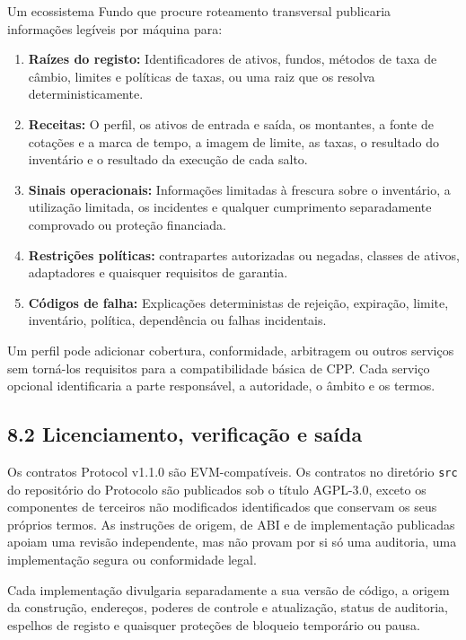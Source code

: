 \documentclass[11pt]{article}
\begin{document}
Um ecossistema Fundo que procure roteamento transversal publicaria informações legíveis por máquina para:

\begin{enumerate}[leftmargin=*]
\item \textbf{Raízes do registo:} Identificadores de ativos, fundos, métodos de taxa de câmbio, limites e políticas de taxas, ou uma raiz que os resolva deterministicamente.
\item \textbf{Receitas:} O perfil, os ativos de entrada e saída, os montantes, a fonte de cotações e a marca de tempo, a imagem de limite, as taxas, o resultado do inventário e o resultado da execução de cada salto.
\item \textbf{Sinais operacionais:} Informações limitadas à frescura sobre o inventário, a utilização limitada, os incidentes e qualquer cumprimento separadamente comprovado ou proteção financiada.
\item \textbf{Restrições políticas:} contrapartes autorizadas ou negadas, classes de ativos, adaptadores e quaisquer requisitos de garantia.
\item \textbf{Códigos de falha:} Explicações deterministas de rejeição, expiração, limite, inventário, política, dependência ou falhas incidentais.
\end{enumerate}
Um perfil pode adicionar cobertura, conformidade, arbitragem ou outros serviços sem torná-los requisitos para a compatibilidade básica de CPP. Cada serviço opcional identificaria a parte responsável, a autoridade, o âmbito e os termos.

\subsection*{8.2 Licenciamento, verificação e saída}

Os contratos Protocol v1.1.0 são EVM-compatíveis. Os contratos no diretório \texttt{src} do repositório do Protocolo são publicados sob o título AGPL-3.0, exceto os componentes de terceiros não modificados identificados que conservam os seus próprios termos. As instruções de origem, de ABI e de implementação publicadas apoiam uma revisão independente, mas não provam por si só uma auditoria, uma implementação segura ou conformidade legal.

Cada implementação divulgaria separadamente a sua versão de código, a origem da construção, endereços, poderes de controle e atualização, status de auditoria, espelhos de registo e quaisquer proteções de bloqueio temporário ou pausa.
\end{document}
